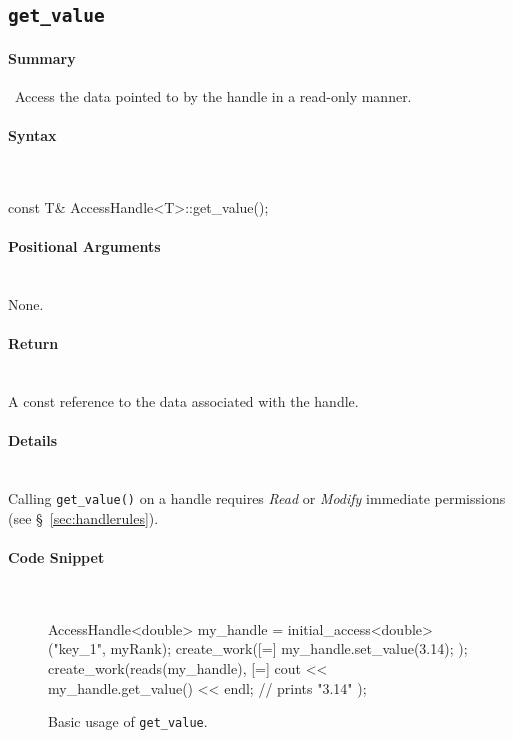 \subsection{\texttt{get\_value}}
\label{ssec:api_fe_get_value}

\paragraph{Summary} \mbox{}\
Access the data pointed to by the handle in a read-only manner.

\paragraph{Syntax}\mbox{}\\
\begin{CppCode}
const T& AccessHandle<T>::get_value();
\end{CppCode}

\paragraph{Positional Arguments}\mbox{}\\ 
None.

\paragraph{Return}\mbox{}\\ 
A const reference to the data associated with the handle.  

\paragraph{Details}\mbox{}\\ 
Calling \texttt{get\_value()} on a handle requires {\it Read} or {\it
Modify} immediate permissions (see \S~\ref{sec:handlerules}).


\paragraph{Code Snippet}\mbox{}\\ 
\begin{figure}[!h]
\begin{CppCodeNumb}
AccessHandle<double> my_handle = initial_access<double>("key_1", myRank);
create_work([=]{
  my_handle.set_value(3.14);
});
create_work(reads(my_handle), [=]{
  cout << my_handle.get_value() << endl; // prints "3.14"
});
\end{CppCodeNumb}
\label{fig:fe_api_get_value}
\caption{Basic usage of \texttt{get\_value}.}
\end{figure}


